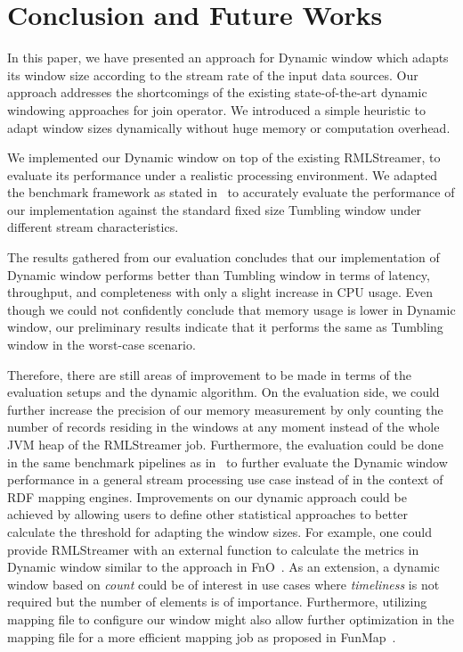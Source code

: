 \chapter{Conclusion and Future Works}%
\label{chap:Conclusion and Future Works}


In this paper, we have presented an approach for Dynamic window 
which adapts its window size according to the stream rate of the 
input data sources. Our approach addresses the shortcomings of 
the existing state-of-the-art dynamic windowing approaches for 
join operator. We introduced a simple heuristic to adapt 
window sizes dynamically without huge memory or computation overhead. 

We implemented our Dynamic window on top of the existing RMLStreamer, 
to evaluate its performance under a realistic processing environment. 
We adapted the benchmark framework as stated in~\cite{evalution_of_spe} to 
accurately evaluate the performance of our implementation against the 
standard fixed size Tumbling window under different stream characteristics. 

The results gathered from our evaluation concludes that our implementation 
of Dynamic window performs better than Tumbling window in terms of 
latency, throughput, and completeness with only a slight 
increase in CPU usage. Even though we could not confidently conclude that
memory usage is lower in Dynamic window, our preliminary results indicate 
that it performs the same as Tumbling window in the worst-case scenario.

Therefore, there are still areas of improvement to be made in terms of the
evaluation setups
and the dynamic algorithm. On the evaluation side, we could further increase 
the precision of our memory measurement by only counting the number of records
residing in the windows at any moment instead of the whole JVM heap of the RMLStreamer job. 
Furthermore, the evaluation could be done in the same benchmark pipelines as in~\cite{evalution_of_spe} 
to further evaluate the Dynamic window performance in a general stream processing use case instead 
of in the context of RDF mapping engines.  
Improvements on our dynamic approach could be achieved by allowing users to 
define other statistical approaches
to better calculate the threshold for adapting the window sizes. For example, one could provide 
RMLStreamer with an external function to calculate the metrics in Dynamic window similar to the approach 
in FnO~\cite{fno_ben}.
As an extension, a dynamic window based on \emph{count} could be of interest in use 
cases where \emph{timeliness} is not required but the number of elements is of importance.
Furthermore, utilizing mapping file to configure our window might also allow further
optimization in the mapping file for a more efficient mapping job as proposed in FunMap~\cite{funmap}. 



